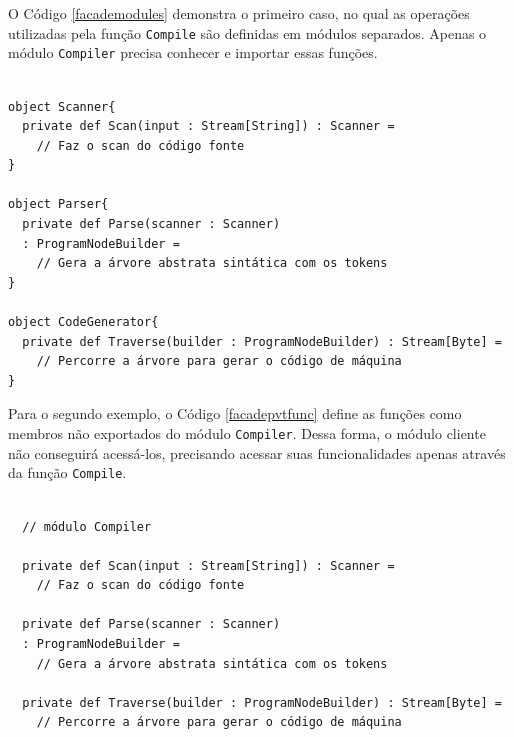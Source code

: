O Código \ref{facademodules} demonstra o primeiro caso, 
no qual as operações utilizadas pela função \texttt{Compile} são 
definidas em módulos separados. Apenas o módulo 
\texttt{Compiler} precisa conhecer e importar essas funções.

\begin{lstlisting}[caption={Função de acesso \texttt{Compile}.},label=facademodules]
    
object Scanner{
  private def Scan(input : Stream[String]) : Scanner = 
    // Faz o scan do código fonte
}

object Parser{
  private def Parse(scanner : Scanner)
  : ProgramNodeBuilder = 
    // Gera a árvore abstrata sintática com os tokens
}

object CodeGenerator{
  private def Traverse(builder : ProgramNodeBuilder) : Stream[Byte] = 
    // Percorre a árvore para gerar o código de máquina
}

\end{lstlisting}

Para o segundo exemplo, o Código \ref{facadepvtfunc} define 
as funções como membros não exportados do módulo \texttt{Compiler}. 
Dessa forma, o módulo cliente não conseguirá acessá-los, 
precisando acessar suas funcionalidades apenas através da 
função \texttt{Compile}.

\begin{lstlisting}[caption={Função de acesso \texttt{Compile}.},label=facadepvtfunc]
    
  // módulo Compiler    

  private def Scan(input : Stream[String]) : Scanner = 
    // Faz o scan do código fonte

  private def Parse(scanner : Scanner)
  : ProgramNodeBuilder = 
    // Gera a árvore abstrata sintática com os tokens

  private def Traverse(builder : ProgramNodeBuilder) : Stream[Byte] = 
    // Percorre a árvore para gerar o código de máquina
    
\end{lstlisting}

